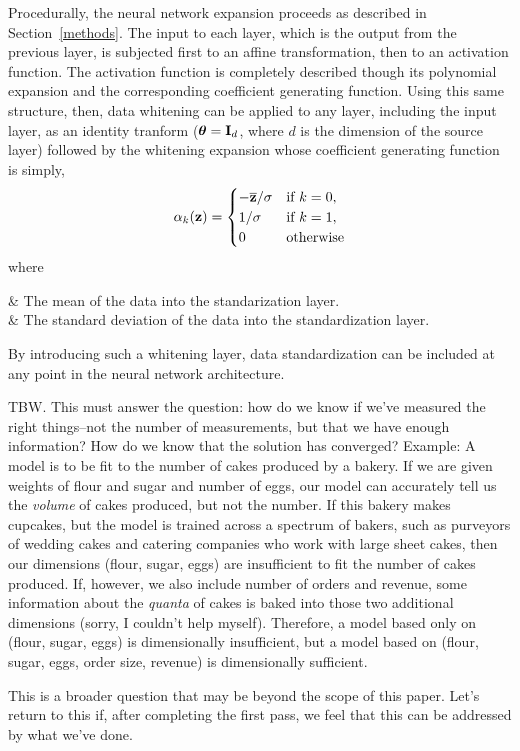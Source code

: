 Procedurally, the neural network expansion proceeds as described in Section~\ref{methods}. The input to each layer, which is the output from the previous layer, is subjected first to an affine transformation, then to an activation function. The activation function is completely described though its polynomial expansion and the corresponding coefficient generating function. Using this same structure, then, data whitening can be applied to any layer, including the input layer, as an identity tranform ($\boldsymbol{\theta} = {\bf I}_d$, where $d$ is the dimension of the source layer) followed by the whitening expansion whose coefficient generating function is simply,
\begin{equation}
    \alpha_k({\bf z}) = \begin{cases}
        -\overline{\bf z}/\sigma    & \mbox{if } k = 0, \\
        1/\sigma                    & \mbox{if } k = 1, \\
        0                           & \mbox{otherwise}
    \end{cases}
\end{equation}
where
\begin{conditions}
        & The mean of the data into the standarization layer. \\
    \sigma              & The standard deviation of the data into the standardization layer.
\end{conditions}
By introducing such a whitening layer, data standardization can be included at any point in the neural network architecture.

{\color{red} TBW. This must answer the question: how do we know if we've measured the right things--not the number of measurements, but that we have enough information? How do we know that the solution has converged? Example: A model is to be fit to the number of cakes produced by a bakery. If we are given weights of flour and sugar and number of eggs, our model can accurately tell us the \emph{volume} of cakes produced, but not the number. If this bakery makes cupcakes, but the model is trained across a spectrum of bakers, such as purveyors of wedding cakes and catering companies who work with large sheet cakes, then our dimensions (flour, sugar, eggs) are insufficient to fit the number of cakes produced. If, however, we also include number of orders and revenue, some information about the \emph{quanta} of cakes is baked into those two additional dimensions (sorry, I couldn't help myself). Therefore, a model based only on (flour, sugar, eggs) is dimensionally insufficient, but a model based on (flour, sugar, eggs, order size, revenue) is dimensionally sufficient.

This is a broader question that may be beyond the scope of this paper. Let's return to this if, after completing the first pass, we feel that this can be addressed by what we've done.}

